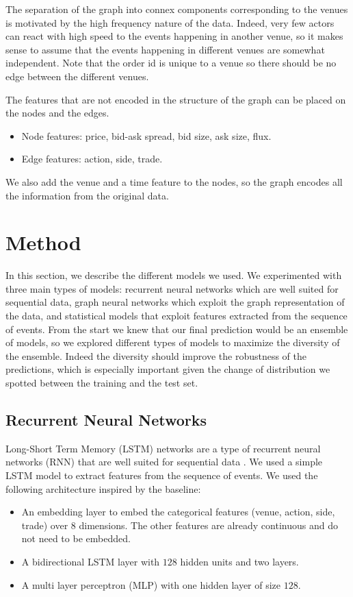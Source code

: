 \documentclass[switch, 11pt]{article}
\begin{document}
\begin{multicols}{2}
    The separation of the graph into connex components corresponding to the venues is motivated by the high frequency nature of the data. Indeed, very few actors can react with high speed to the events happening in another venue, so it makes sense to assume that the events happening in different venues are somewhat independent. Note that the order id is unique to a venue so there should be no edge between the different venues.

    The features that are not encoded in the structure of the graph can be placed on the nodes and the edges.
    \begin{itemize}
        \item Node features: price, bid-ask spread, bid size, ask size, flux.
        \item Edge features: action, side, trade.
    \end{itemize}
    We also add the venue and a time feature to the nodes, so the graph encodes all the information from the original data.

    \section{Method}

    In this section, we describe the different models we used. We experimented with three main types of models: recurrent neural networks which are well suited for sequential data, graph neural networks which exploit the graph representation of the data, and statistical models that exploit features extracted from the sequence of events. From the start we knew that our final prediction would be an ensemble of models, so we explored different types of models to maximize the diversity of the ensemble. Indeed the diversity should improve the robustness of the predictions, which is especially important given the change of distribution we spotted between the training and the test set.

    \subsection{Recurrent Neural Networks}

    Long-Short Term Memory (LSTM) networks are a type of recurrent neural networks (RNN) that are well suited for sequential data \cite{hochreiter-1997}. We used a simple LSTM model to extract features from the sequence of events. We used the following architecture inspired by the baseline:
    \begin{itemize}
        \item An embedding layer to embed the categorical features (venue, action, side, trade) over $8$ dimensions. The other features are already continuous and do not need to be embedded.
        \item A bidirectional LSTM layer with $128$ hidden units and two layers.
        \item A multi layer perceptron (MLP) with one hidden layer of size $128$.
    \end{itemize}


\end{multicols}
\end{document}
